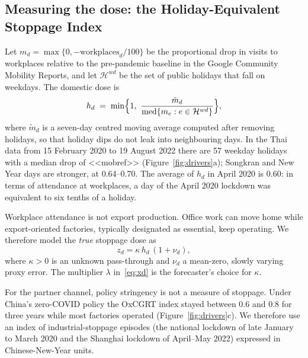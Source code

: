 \documentclass{article}
\theoremstyle{plain}
\theoremstyle{definition}
\theoremstyle{remark}
\begin{document}
\subsection{Measuring the dose: the Holiday-Equivalent Stoppage Index}
Let $m_d=\max\{0,-\text{workplaces}_d/100\}$ be the proportional drop in visits to workplaces relative to the pre-pandemic baseline in the Google Community Mobility Reports, and let $\mathcal{H}^{wd}$ be the set of public holidays that fall on weekdays. The domestic dose is
\begin{equation}\label{eq:hesi}
h_d \;=\; \min\Bigl\{1,\ \frac{\tilde m_d}{\operatorname{med}\{m_e: e\in\mathcal{H}^{wd}\}}\Bigr\},
\end{equation}
where $\tilde m_d$ is a seven-day centred moving average computed after removing holidays, so that holiday dips do not leak into neighbouring days. In the Thai data from 15 February 2020 to 19 August 2022 there are 57 weekday holidays with a median drop of <<mobref>> (Figure~\ref{fig:drivers}a); Songkran and New Year days are stronger, at 0.64--0.70. The average of $h_d$ in April 2020 is 0.60: in terms of attendance at workplaces, a day of the April 2020 lockdown was equivalent to six tenths of a holiday.

Workplace attendance is not export production. Office work can move home while export-oriented factories, typically designated as essential, keep operating. We therefore model the \emph{true} stoppage dose as
\begin{equation}\label{eq:measurement}
z_d = \kappa\, h_d\,(1+\nu_d),
\end{equation}
where $\kappa>0$ is an unknown pass-through and $\nu_d$ a mean-zero, slowly varying proxy error. The multiplier $\lambda$ in~\eqref{eq:xd} is the forecaster's choice for $\kappa$.

For the partner channel, policy stringency is not a measure of stoppage. Under China's zero-COVID policy the OxCGRT index stayed between 0.6 and 0.8 for three years while most factories operated (Figure~\ref{fig:drivers}c). We therefore use an index of industrial-stoppage episodes (the national lockdown of late January to March 2020 and the Shanghai lockdown of April--May 2022) expressed in Chinese-New-Year units.
\end{document}
